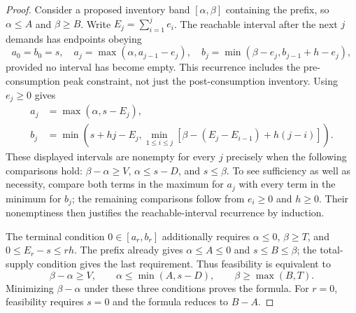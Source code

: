 \documentclass[11pt]{article}
\begin{document}
\begin{proof}
Consider a proposed inventory band $[\alpha,\beta]$ containing the prefix,
so $\alpha\le A$ and $\beta\ge B$. Write $E_j=\sum_{i=1}^j e_i$.
The reachable interval after the next $j$ demands has endpoints obeying
\[
a_0=b_0=s,\quad
a_j=\max(\alpha,a_{j-1}-e_j),\quad
b_j=\min(\beta-e_j,b_{j-1}+h-e_j),
\]
provided no interval has become empty. This recurrence includes the
pre-consumption peak constraint, not just the post-consumption inventory.
Using $e_j\ge0$ gives
\begin{align*}
a_j&=\max(\alpha,s-E_j),\\
b_j&=\min\left(s+hj-E_j,
       \min_{1\le i\le j}\left[\beta-(E_j-E_{i-1})+h(j-i)\right]\right).
\end{align*}
These displayed intervals are nonempty for every $j$ precisely when the
following comparisons hold: $\beta-\alpha\ge V$, $\alpha\le s-D$, and
$s\le\beta$. To see sufficiency as well as necessity, compare both terms
in the maximum for $a_j$ with every term in the minimum for $b_j$;
the remaining comparisons follow from $e_i\ge0$ and $h\ge0$.
Their nonemptiness then justifies the reachable-interval recurrence by induction.

The terminal condition $0\in[a_r,b_r]$ additionally requires
$\alpha\le0$, $\beta\ge T$, and $0\le E_r-s\le rh$.
The prefix already gives $\alpha\le A\le0$ and $s\le B\le\beta$;
the total-supply condition gives the last requirement. Thus feasibility is
equivalent to
\[
\beta-\alpha\ge V,\qquad
\alpha\le\min(A,s-D),\qquad \beta\ge\max(B,T).
\]
Minimizing $\beta-\alpha$ under these three conditions proves the formula.
For $r=0$, feasibility requires $s=0$ and the formula reduces to $B-A$.
\end{proof}
\end{document}
